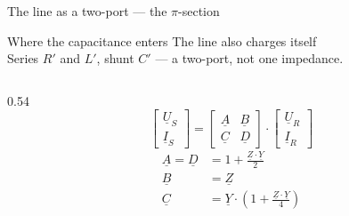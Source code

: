 %
\providecommand{\acfig}[1]{ac-transmission/fig/#1}

\begin{frame}{The line as a two-port --- the $\pi$-section}
  \begin{block}{Where the capacitance enters}
    {The line also charges itself\\
    Series $R'$ and $L'$, shunt $C'$ --- a two-port, not one impedance.}
  \end{block}

  \vspace{0.5em}
  \begin{columns}[c,onlytextwidth]
    \begin{column}{0.44\textwidth}\centering
      }\\[0.8em]
      \setlength{\abovedisplayskip}{2pt}\setlength{\belowdisplayskip}{2pt}
      \[ \begin{aligned}
           \underline{Z} &= \left(R'+j\cdot\omega\cdot L'\right)\cdot l \\
           \underline{Y} &= \left(G'+j\cdot\omega\cdot C'\right)\cdot l
         \end{aligned} \]
    \end{column}
    \begin{column}{0.54\textwidth}
      \setlength{\abovedisplayskip}{2pt}\setlength{\belowdisplayskip}{2pt}
      \[ \begin{bmatrix}\underline{U}_S\\[0.2em] \underline{I}_S\end{bmatrix}
         = \begin{bmatrix}\underline{A} & \underline{B}\\[0.2em]
                          \underline{C} & \underline{D}\end{bmatrix}
           \cdot
           \begin{bmatrix}\underline{U}_R\\[0.2em] \underline{I}_R\end{bmatrix} \]
      \[ \begin{aligned}
           \underline{A}=\underline{D} &= 1+\frac{\underline{Z}\cdot\underline{Y}}{2} \\
           \underline{B} &= \underline{Z} \\
           \underline{C} &= \underline{Y}\cdot
                 \left(1+\frac{\underline{Z}\cdot\underline{Y}}{4}\right)
         \end{aligned} \]
    \end{column}
  \end{columns}

\end{frame}
